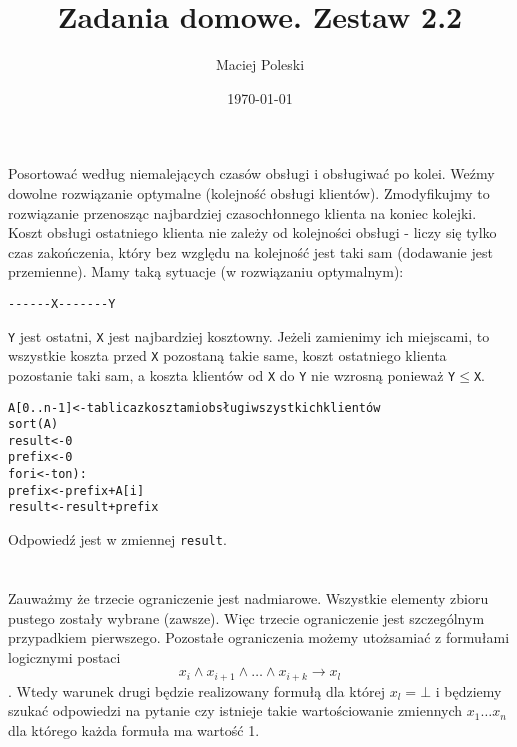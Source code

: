 \documentclass[a4paper,12pt]{article}
\title{Zadania domowe. Zestaw 2.2}
\author{Maciej Poleski}
\date{\today}
\begin{document}
\maketitle

\newpage

\section{}

\section{}
Posortować według niemalejących czasów obsługi i obsługiwać po kolei. Weźmy dowolne rozwiązanie optymalne (kolejność obsługi klientów). Zmodyfikujmy to rozwiązanie przenosząc najbardziej czasochłonnego klienta na koniec kolejki. Koszt obsługi ostatniego klienta nie zależy od kolejności obsługi - liczy się tylko czas zakończenia, który bez względu na kolejność jest taki sam (dodawanie jest przemienne). Mamy taką sytuacje (w rozwiązaniu optymalnym):
\begin{verbatim}
------X-------Y
\end{verbatim}
\verb|Y| jest ostatni, \verb|X| jest najbardziej kosztowny. Jeżeli zamienimy ich miejscami, to wszystkie koszta przed \verb|X| pozostaną takie same, koszt ostatniego klienta pozostanie taki sam, a koszta klientów od \verb|X| do \verb|Y| nie wzrosną ponieważ \verb|Y|$\leq$\verb|X|.
\begin{alltt}
 A[0..n-1] <- tablica z kosztami obsługi wszystkich klientów
 sort(A)
 result <- 0
 prefix <- 0
 for i <- to n):
    prefix <- prefix + A[i]
    result <- result + prefix

\end{alltt}
Odpowiedź jest w zmiennej \verb|result|.
\section{}
Zauważmy że trzecie ograniczenie jest nadmiarowe. Wszystkie elementy zbioru pustego zostały wybrane (zawsze). Więc trzecie ograniczenie jest szczególnym przypadkiem pierwszego. Pozostałe ograniczenia możemy utożsamiać z formułami logicznymi postaci $$x_i \wedge x_{i+1} \wedge \ldots \wedge x_{i+k} \rightarrow x_l$$. Wtedy warunek drugi będzie realizowany formułą dla której $x_l = \bot$ i będziemy szukać odpowiedzi na pytanie czy istnieje takie wartościowanie zmiennych $x_1 \ldots x_n$ dla którego każda formuła ma wartość 1.
\end{document}

